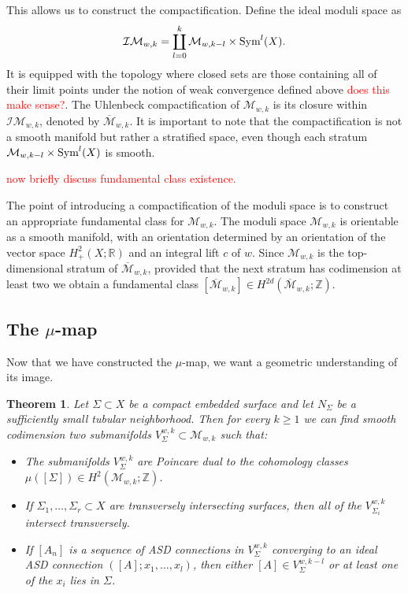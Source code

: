 \documentclass[a4paper]{article}
\newcommand{\Z}{\mathbb{Z}}
\newcommand{\M}{\mathcal{M}}
\newcommand{\R}{\mathbb{R}}
\newcommand{\Sym}{\textnormal{Sym}}
\newtheorem{theorem}{Theorem}
\theoremstyle{definition}
\numberwithin{theorem}{subsection}
\begin{document}
This allows us to construct the compactification. Define the ideal moduli space as
$$\mathcal{IM}_{w,k} = \coprod_{l=0}^k \M_{w,k-l}\times\Sym^l(X).$$
It is equipped with the topology where closed sets are those containing all of their limit points under the notion of weak convergence defined above \textcolor{red}{does this make sense?}. The Uhlenbeck compactification of $\M_{w,k}$ is its closure within $\mathcal{IM}_{w,k}$, denoted by $\overline{\M}_{w,k}$. It is important to note that the compactification is not a smooth manifold but rather a stratified space, even though each stratum $\M_{w,k-l}\times\Sym^l(X)$ is smooth. 
\newline

\textcolor{red}{now briefly discuss fundamental class existence.}

The point of introducing a compactification of the moduli space is to construct an appropriate fundamental class for $\M_{w,k}$. The moduli space $\M_{w,k}$ is orientable as a smooth manifold, with an orientation determined by an orientation of the vector space $H^{2}_+(X;\R)$ and an integral lift $c$ of $w$. Since $\M_{w,k}$ is the top-dimensional stratum of $\overline{\M}_{w,k}$, provided that the next stratum has codimension at least two we obtain a fundamental class $[\overline{\M}_{w,k}]\in H^{2d}(\overline{\M}_{w,k};\Z)$. 



\subsection{The $\mu$-map}



Now that we have constructed the $\mu$-map, we want a geometric understanding of its image. 

\begin{theorem}
    Let $\Sigma\subset X$ be a compact embedded surface and let $N_{\Sigma}$ be a sufficiently small tubular neighborhood. Then for every $k\geq 1$ we can find smooth codimension two submanifolds $V_{\Sigma}^{w,k}\subset \M_{w,k}$ such that:
    \begin{itemize}
        \item The submanifolds $V_{\Sigma}^{w,k}$ are Poincare dual to the cohomology classes $\mu([\Sigma])\in H^2(\M_{w,k};\Z)$.
        \item If $\Sigma_1,\dots,\Sigma_r\subset X$ are transversely intersecting surfaces, then all of the $V_{\Sigma_i}^{w,k}$ intersect transversely. 
        \item If $[A_n]$ is a sequence of ASD connections in $V_{\Sigma}^{w,k}$ converging to an ideal ASD connection $([A];x_1,\dots,x_l)$, then either $[A]\in V_{\Sigma}^{w,k-l}$ or at least one of the $x_i$ lies in $\Sigma$.
    \end{itemize}
\end{theorem}
\end{document}
